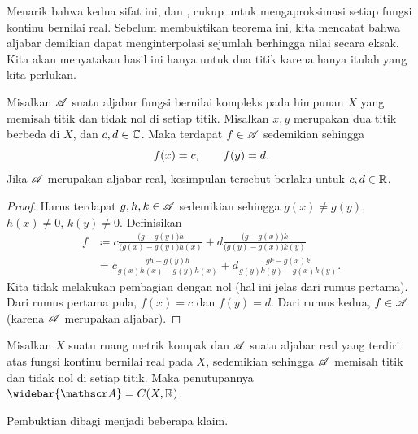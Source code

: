 Menarik bahwa kedua sifat ini,
 dan
, cukup untuk mengaproksimasi setiap fungsi
kontinu bernilai real. Sebelum membuktikan teorema ini, kita mencatat bahwa
aljabar demikian dapat menginterpolasi sejumlah berhingga nilai secara eksak.
Kita akan menyatakan hasil ini hanya untuk dua titik karena hanya itulah yang
kita perlukan.

\begin{prop} \label{prop:SWinterpolate}
Misalkan ${\mathscr{A}}$ suatu aljabar fungsi bernilai kompleks pada himpunan $X$ yang
memisah titik dan tidak nol di setiap titik. Misalkan $x,y$ merupakan dua titik
berbeda di $X$, dan $c,d \in {\mathbb{C}}$. Maka terdapat $f \in {\mathscr{A}}$ sedemikian sehingga
\begin{equation*}
f(x) = c, \qquad f(y) = d .
\avoidbreak
\end{equation*}
Jika ${\mathscr{A}}$ merupakan aljabar real, kesimpulan tersebut berlaku untuk
$c,d \in {\mathbb{R}}$.
\end{prop}

\begin{proof}
Harus terdapat $g,h,k \in {\mathscr{A}}$
sedemikian sehingga
$g(x) \neq g(y)$, $h(x) \neq 0$, $k(y) \neq 0$.
Definisikan
\begin{equation*}
\begin{split}
f & \coloneqq 
c
\frac{\bigl(g - g(y)\bigr)h}{\bigl(g(x)-g(y)\bigr)h(x) } + 
d
\frac{\bigl(g - g(x)\bigr)k}{\bigl(g(y)-g(x)\bigr)k(y)}
\\
& =
c
\frac{gh - g(y)h}{g(x)h(x)-g(y)h(x) } + 
d
\frac{gk - g(x)k}{g(y)k(y)-g(x)k(y)} .
\end{split}
\end{equation*}
Kita tidak melakukan pembagian dengan nol (hal ini jelas dari rumus pertama).
Dari rumus pertama pula, $f(x) = c$ dan $f(y) = d$.
Dari rumus kedua, $f \in {\mathscr{A}}$ (karena ${\mathscr{A}}$ merupakan aljabar).
\end{proof}

\begin{thm}
\label{thm:SWreal}%
%
Misalkan $X$ suatu ruang metrik kompak dan ${\mathscr{A}}$ suatu aljabar real yang terdiri
atas fungsi kontinu bernilai real pada $X$, sedemikian sehingga ${\mathscr{A}}$ memisah
titik dan tidak nol di setiap titik. Maka penutupannya
$\widebar{\sA} = C(X,\R)$.
\end{thm}

Pembuktian dibagi menjadi beberapa klaim.

\medskip


